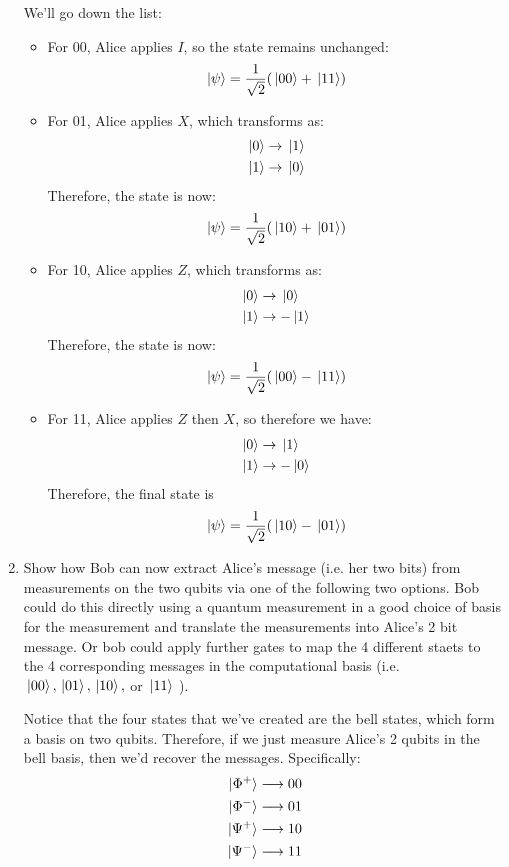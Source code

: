 \documentclass[10pt]{article}
\begin{document}
\begin{enumerate}[label=\alph*)]
			\begin{solution}
				We'll go down the list: 
				\begin{itemize}
					\item For 00, Alice applies \( I \), so the state remains unchanged:
						\[
						\ket*{\psi} = \frac{1}{\sqrt{2} }(\ket*{00} + \ket*{11})
						\] 
					\item For 01, Alice applies \( X \), which transforms as: 
						\begin{align*}
							\ket*{0} & \rightarrow \ket*{1}\\
							\ket*{1} & \rightarrow \ket*{0}
						\end{align*}
						Therefore, the state is now:
						\[
						\ket*{\psi} = \frac{1}{\sqrt{2} }(\ket*{10} + \ket*{01})
						\] 
					\item For 10, Alice applies \( Z \), which transforms as: 
						\begin{align*}
							\ket*{0} &\rightarrow \ket*{0}\\
							\ket*{1} & \rightarrow -\ket*{1}
						\end{align*}
						Therefore, the state is now:
						\[
						\ket*{\psi} = \frac{1}{\sqrt{2} }(\ket*{00} - \ket*{11})
						\] 
					\item For 11, Alice applies \( Z \) then \( X \), so therefore we have: 
						\begin{align*}
							\ket*{0} &\rightarrow \ket*{1}\\
							\ket*{1} &\rightarrow -\ket*{0}
						\end{align*} 
						Therefore, the final state is
						\[
						\ket*{\psi} = \frac{1}{\sqrt{2} }(\ket*{10} - \ket*{01})
						\] 
				\end{itemize}
			\end{solution}
		\item Show how Bob can now extract Alice's message (i.e. her two bits) from measurements on the two qubits
			via one of the following two options. Bob could do this directly using a quantum measurement in a good
			choice of basis for the measurement and translate the measurements into Alice's 2 bit message. Or bob 
			could apply further gates to map the 4 different staets to the 4 corresponding 
			messages in the computational basis (i.e. \( \ket*{00}, \ket*{01}, \ket*{10}, \) or \( \ket*{11} \) ). 

			\begin{solution}
				Notice that the four states that we've created are the bell states, which form a basis 
				on two qubits. Therefore, if we just measure Alice's 2 qubits in the bell basis, then we'd 
				recover the messages. Specifically: 
				\begin{align*}
					\ket*{\Phi^{+}} &\longrightarrow 00\\
					\ket*{\Phi^{-}}&\longrightarrow 01\\
					\ket*{\Psi^{+}}&\longrightarrow 10\\
					\ket*{\Psi^{-}}&\longrightarrow 11
				\end{align*}
			\end{solution}
	\end{enumerate}
\end{document}
